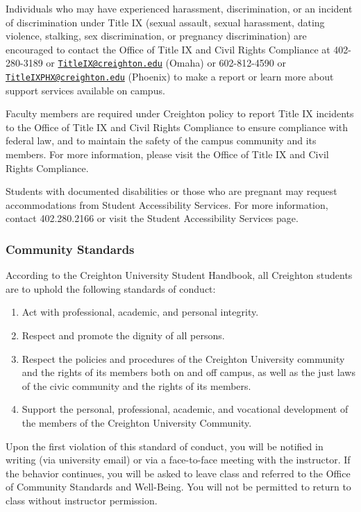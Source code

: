 \documentclass[
  11pt,
  letterpaper,
  DIV=11,
  numbers=noendperiod]{scrartcl}
\providecommand{\tightlist}{%
  \setlength{\itemsep}{0pt}\setlength{\parskip}{0pt}}\usepackage{longtable,booktabs,array}
\begin{document}
Individuals who may have experienced harassment, discrimination, or an
incident of discrimination under Title IX (sexual assault, sexual
harassment, dating violence, stalking, sex discrimination, or pregnancy
discrimination) are encouraged to contact the Office of Title IX and
Civil Rights Compliance at 402-280-3189 or
\href{mailto:TitleIX@creighton.edu}{\nolinkurl{TitleIX@creighton.edu}}
(Omaha) or 602-812-4590 or
\href{mailto:TitleIXPHX@creighton.edu}{\nolinkurl{TitleIXPHX@creighton.edu}}
(Phoenix) to make a report or learn more about support services
available on campus.

Faculty members are required under Creighton policy to report Title IX
incidents to the Office of Title IX and Civil Rights Compliance to
ensure compliance with federal law, and to maintain the safety of the
campus community and its members. For more information, please visit the
Office of Title IX and Civil Rights Compliance.

Students with documented disabilities or those who are pregnant may
request accommodations from Student Accessibility Services. For more
information, contact 402.280.2166 or visit the Student Accessibility
Services page.

\subsubsection{Community Standards}\label{community-standards}

According to the Creighton University Student Handbook, all Creighton
students are to uphold the following standards of conduct:

\begin{enumerate}
\def\labelenumi{\arabic{enumi}.}
\tightlist
\item
  Act with professional, academic, and personal integrity.
\item
  Respect and promote the dignity of all persons.
\item
  Respect the policies and procedures of the Creighton University
  community and the rights of its members both on and off campus, as
  well as the just laws of the civic community and the rights of its
  members.
\item
  Support the personal, professional, academic, and vocational
  development of the members of the Creighton University Community.
\end{enumerate}

Upon the first violation of this standard of conduct, you will be
notified in writing (via university email) or via a face-to-face meeting
with the instructor. If the behavior continues, you will be asked to
leave class and referred to the Office of Community Standards and
Well-Being. You will not be permitted to return to class without
instructor permission.
\end{document}
